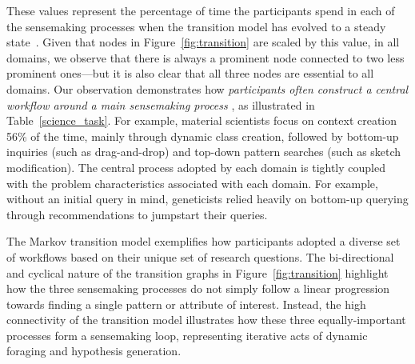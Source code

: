  These values represent the percentage of time the participants
 spend in each of the sensemaking processes
 when the transition model has evolved to a steady state~\cite{pierre2011}.
 Given that nodes in Figure~\ref{fig:transition}
 are scaled by this value, in all domains,
 we observe that there is always a prominent node
 connected to two less prominent ones---but it is also clear
 that all three nodes are essential to all domains.
 Our observation demonstrates how \emph{participants
 often construct a central workflow
 around a main sensemaking process }, as illustrated in Table~\ref{science_task}. For example,  material scientists focus on context creation 56\% of the time, mainly through dynamic class creation,
 followed by bottom-up inquiries (such as drag-and-drop)
  and top-down pattern searches (such as sketch modification).
 The central process adopted by each domain
 is tightly coupled with the problem characteristics associated with each domain. For example, without an initial query in mind,
 geneticists relied heavily on bottom-up querying
 through recommendations to jumpstart their queries.
 \par The Markov transition model exemplifies how participants
 adopted a diverse set of workflows
 based on their unique set of research questions. The bi-directional and cyclical nature
 of the transition graphs in Figure~\ref{fig:transition} highlight how the three sensemaking processes do not simply follow a linear progression towards finding a single pattern or attribute of interest. %
 Instead, the high connectivity of the transition model illustrates how these three equally-important processes form a sensemaking loop, representing iterative acts of dynamic foraging and hypothesis generation.  %
